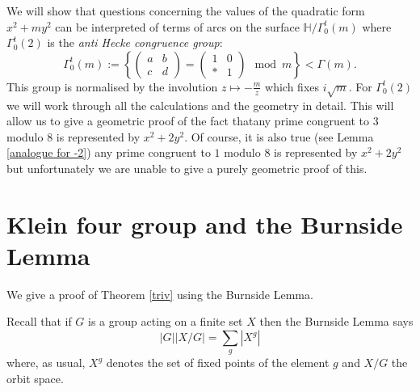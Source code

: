 \documentclass[12pt,a4paper]{amsart}
\def\ah{\Gamma_0^t(2)}
\begin{document}
We will show that questions concerning the values of the quadratic form $x^2
+ m y^2$ can be interpreted of terms of arcs on the surface
$\mathbb{H}/\Gamma^t_0(m)$ where
$\ah$ is the 
\textit{anti Hecke congruence group}:
$$ \Gamma^t_0(m) := \left \{ \begin{pmatrix} a & b \\ c & d \end{pmatrix} = 
\begin{pmatrix} 1 & 0 \\ * & 1 \end{pmatrix} \mod m \right \} <
\Gamma(m).$$
This group is 
normalised by the involution $z\mapsto -\frac{m}{z}$
which fixes $i\sqrt{m}$.
For $\Gamma^t_0(2)$  we will work through all the calculations and
the geometry in detail.
This will allow us to give a geometric proof of the fact thatany
prime congruent to $3$ modulo 8 is represented by $x^2 + 2y^2$.
Of course, it is also true (see Lemma \ref{analogue for -2})
	any
prime congruent to $1$ modulo 8 is represented by $x^2 + 2y^2$ but
unfortunately we are unable to give a purely geometric proof of
this.




\section{Klein four group and the Burnside Lemma}

We give a proof of Theorem \ref{triv} using the Burnside Lemma.


Recall that if $G$ is  a group acting on a finite set $X$ then the Burnside Lemma says
\begin{equation}\label{burnside}
|G| |X/G| = \sum_{g} |X^g| 
\end{equation}  
where, as usual, 
 $X^g$ denotes the set of fixed points of the element $g$ 
 and $X/G$  the orbit space.
\end{document}

